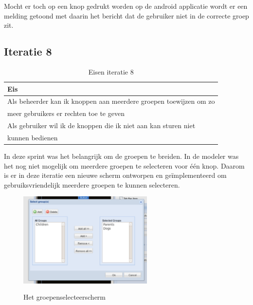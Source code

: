 \documentclass[]{article}
\begin{document}
Mocht er toch op een knop gedrukt worden op de android applicatie wordt er een
melding getoond met daarin het bericht dat de gebruiker niet in de correcte
groep zit. 

\subsection{Iteratie 8}

\begin{table}[htpb]
  \caption{Eisen iteratie 8}
  \begin{center}
    \begin{tabular}{|| l ||}\hline
        Eis                                                              \\\hline\hline
        Als beheerder kan ik knoppen aan meerdere groepen toewijzen om zo\\
        meer gebruikers er rechten toe te geven                          \\\hline
        Als gebruiker wil ik de knoppen die ik niet aan kan sturen niet  \\ 
        kunnen bedienen                                                  \\\hline
    \end{tabular}
  \end{center}
\end{table}

In deze sprint was het belangrijk om de groepen te breiden. In de modeler was
het nog niet mogelijk om meerdere groepen te selecteren voor \'e\'en knop.
Daarom is er in deze iteratie een nieuwe scherm ontworpen en ge\"implementeerd
om gebruiksvriendelijk meerdere groepen te kunnen selecteren.

\begin{figure}[h!]
  \centering
    \includegraphics[width=0.6\textwidth,keepaspectratio]{groupselect.pdf}
  \label{fig:groupselect}
  \caption{Het groepenselecteerscherm}
\end{figure}
\end{document}
